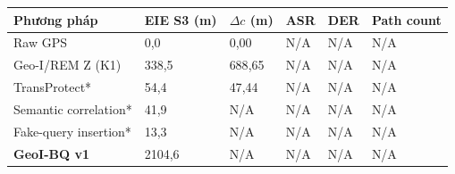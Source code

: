\par\smallskip\noindent\begin{tabularx}{\linewidth}{@{}P{3.7cm}XXXXX@{}}\toprule
\textbf{Phương pháp} & \textbf{EIE S3 (m)} & \textbf{$\Delta c$ (m)} & \textbf{ASR} & \textbf{DER} & \textbf{Path count} \\
\midrule
Raw GPS & 0{,}0 & 0{,}00 & N/A & N/A & N/A \\
Geo-I/REM Z (K1) & 338{,}5 & 688{,}65 & N/A & N/A & N/A \\
TransProtect* & 54{,}4 & 47{,}44 & N/A & N/A & N/A \\
Semantic correlation* & 41{,}9 & N/A & N/A & N/A & N/A \\
Fake-query insertion* & 13{,}3 & N/A & N/A & N/A & N/A \\
\textbf{GeoI-BQ v1} & 2104{,}6 & N/A & N/A & N/A & N/A \\
\bottomrule\end{tabularx}\par\smallskip
